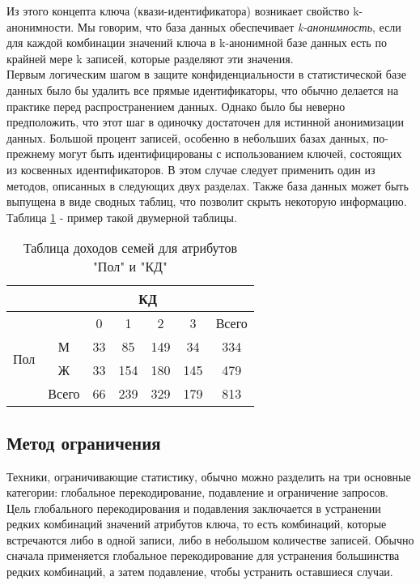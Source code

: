 Из этого концепта ключа (квази-идентификатора) возникает свойство k-анонимности. Мы говорим, что база данных обеспечивает \textit{k-анонимность}, если для каждой комбинации значений ключа в k-анонимной базе данных есть по крайней мере k записей, которые разделяют эти значения.
\\

Первым логическим шагом в защите конфиденциальности в статистической базе данных было бы удалить все прямые идентификаторы, что обычно делается на практике перед распространением данных. Однако было бы неверно предположить, что этот шаг в одиночку достаточен для истинной анонимизации данных. Большой процент записей, особенно в небольших базах данных, по-прежнему могут быть идентифицированы с использованием ключей, состоящих из косвенных идентификаторов. В этом случае следует применить один из методов, описанных в следующих двух разделах. Также база данных может быть выпущена в виде сводных таблиц, что позволит скрыть некоторую информацию. Таблица \ref{tab:summain1} - пример такой двумерной таблицы. 

\begin{table}[h]
\centering
\begin{tabular}{|c|cccccc|}
\hline
                        & \multicolumn{6}{c|}{КД}                                                                                                         \\ \hline
\multirow{4}{*}{Пол} & \multicolumn{1}{c|}{}      & \multicolumn{1}{c|}{0}  & \multicolumn{1}{c|}{1}   & \multicolumn{1}{c|}{2}   & \multicolumn{1}{c|}{3}   & Всего \\ \cline{2-7} 
                        & \multicolumn{1}{c|}{М}     & \multicolumn{1}{c|}{33} & \multicolumn{1}{c|}{85}  & \multicolumn{1}{c|}{149} & \multicolumn{1}{c|}{34}  & 334   \\ \cline{2-7} 
                        & \multicolumn{1}{c|}{Ж}     & \multicolumn{1}{c|}{33} & \multicolumn{1}{c|}{154} & \multicolumn{1}{c|}{180} & \multicolumn{1}{c|}{145} & 479   \\ \cline{2-7} 
                       & \multicolumn{1}{c|}{Всего} & \multicolumn{1}{c|}{66} & \multicolumn{1}{c|}{239} & \multicolumn{1}{c|}{329} & \multicolumn{1}{c|}{179} & 813   \\ \hline
\end{tabular}
\caption{Таблица доходов семей для атрибутов "Пол" и "КД"}
\label{tab:summain1}
\end{table}

\subsection{Метод ограничения}
Техники, ограничивающие статистику, обычно можно разделить на три основные категории: глобальное перекодирование, подавление и ограничение запросов. Цель глобального перекодирования и подавления заключается в устранении редких комбинаций значений атрибутов ключа, то есть комбинаций, которые встречаются либо в одной записи, либо в небольшом количестве записей. Обычно сначала применяется глобальное перекодирование для устранения большинства редких комбинаций, а затем подавление, чтобы устранить оставшиеся случаи.
\\


